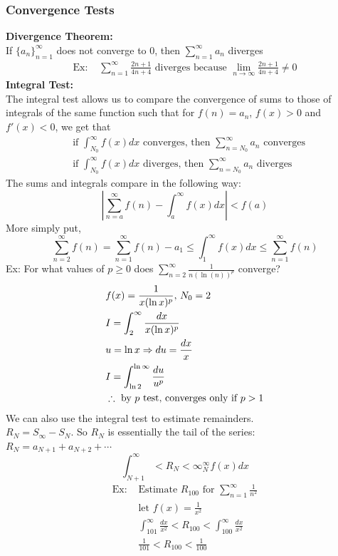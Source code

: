 \documentclass[11pt, fleqn]{article}
\begin{document}
\subsubsection{Convergence Tests}
\textbf{Divergence Theorem:}\\
If $\{a_n\}_{n=1}^\infty$ does not converge to 0, then $\displaystyle{\sum_{n=1}^\infty a_n}$ diverges\\
\begin{align*}
    \text{Ex: }&\sum_{n=1}^\infty\frac{2n+1}{4n+4}\text{ diverges because }\lim_{n\to\infty}\frac{2n+1}{4n+4}\neq 0
\end{align*}
\textbf{Integral Test:}\\
The integral test allows us to compare the convergence of sums to those of integrals of the same function such that for $f(n)=a_n$, $f(x)>0$ and $f'(x)<0$, we get that
\begin{align*}
    &\text{if }\int_{N_0}^\infty f(x)dx\text{ converges, then }\sum_{n=N_0}^\infty a_n\text{ converges}\\
    &\text{if }\int_{N_0}^\infty f(x)dx\text{ diverges, then }\sum_{n=N_0}^\infty a_n\text{ diverges}
\end{align*}
The sums and integrals compare in the following way:\\
$$\left|\sum_{n=a}^\infty f(n)-\int_a^\infty f(x)dx\right|<f(a)$$
More simply put,
$$\sum_{n=2}^\infty f(n)=\sum_{n=1}^\infty f(n)-a_1\leq\int_1^\infty f(x)dx\leq \sum_{n=1}^\infty f(n)$$
Ex: For what values of $p\geq 0$ does $\displaystyle{\sum_{n=2}^\infty\frac{1}{n(\ln(n))^p}}$ converge?
\begin{align*}
    &f(x)=\frac{1}{x(\ln x)^p},\,N_0=2\\
    &I=\int_2^\infty\frac{dx}{x(\ln x)^p}\\
    &u=\ln x\Rightarrow du=\frac{dx}{x}\\
    &I=\int_{\ln2}^{\ln\infty}\frac{du}{u^p}\\
    &\therefore\text{ by $p$ test, converges only if }p>1
\end{align*}
We can also use the integral test to estimate remainders.\\
$R_N=S_\infty-S_N$. So $R_N$ is essentially the tail of the series: $R_N=a_{N+1}+a_{N+2}+\cdots$
$$\int_{N+1}^\infty<R_N<\infty_N^\infty f(x)dx$$
\begin{align*}
    \text{Ex: }&\text{Estimate $R_{100}$ for }\sum_{n=1}^\infty\frac{1}{n^2}\\
    &\text{let }f(x)=\frac{1}{x^2}\\
    &\int_{101}^\infty\frac{dx}{x^2}<R_{100}<\int_{100}^\infty\frac{dx}{x^2}\\
    &\frac{1}{101}<R_{100}<\frac{1}{100}
\end{align*}
\end{document}
